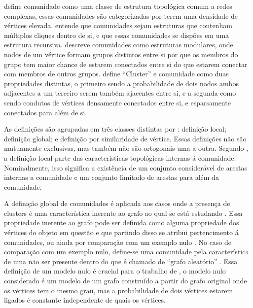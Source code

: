 \documentclass[notes.tex]{subfiles}
\begin{document}
 define comunidade como uma classe de estrutura topológica comum a redes complexas, essas comunidades são categorizadas por terem uma densidade de vértices elevada.
 entende que comunidades sejam estruturas que contenham múltiplos cliques dentro de si, e que essas comunidades se dispões em uma estrutura recursiva.
 descreve comunidades como estruturas modulares, onde nodos de um vértice formam grupos distintos entre si por que os membros do grupo tem maior chance de estarem conectados entre si do que estarem conectar com membros de outros grupos.
 define ``Cluster'' e comunidade como duas propriedades distintas, o primeiro sendo a probabilidade de dois nodos ambos adjacentes a um terceiro serem também ajacentes entre si, e a segunda como sendo condutos de vértices densamente conectados entre si, e esparsamente conectados para além de si.

As definições são agrupadas em três classes distintas por : definição local; definição global; e definição por similaridade de vértice.
Essas definições não são mutuamente exclusivas, mas também não são ortogonais uma a outra.
Segundo , a definição local parte das características topológicas internas á comunidade.
Nominalmente, isso significa a existência de um conjunto considerável de arestas internas a comunidade e um conjunto limitado de arestas para além da comunidade.

A definição global de comunidades é aplicada aos casos onde a presença de clusters é uma característica inerente ao grafo ao qual se está estudando .
Essa propriedade inerente ao grafo pode ser definida como alguma propriedade dos vértices do objeto em questão e que partindo disso se atribui pertencimento á comunidades, ou ainda por comparação com um exemplo nulo .
No caso de comparação com um exemplo nulo, define-se uma comunidade pela característica de uma não ser presente dentro do que é chamado de ``grafo aleatório'' \cite{fortunato2010community}.
Essa definição de um modelo nulo é crucial para o trabalho de , o modelo nulo considerado é um modelo de um grafo construído a partir do grafo original onde os vértices tem o mesmo grau, mas a probabilidade de dois vértices estarem ligados é constante independente de quais os vértices.
\end{document}
